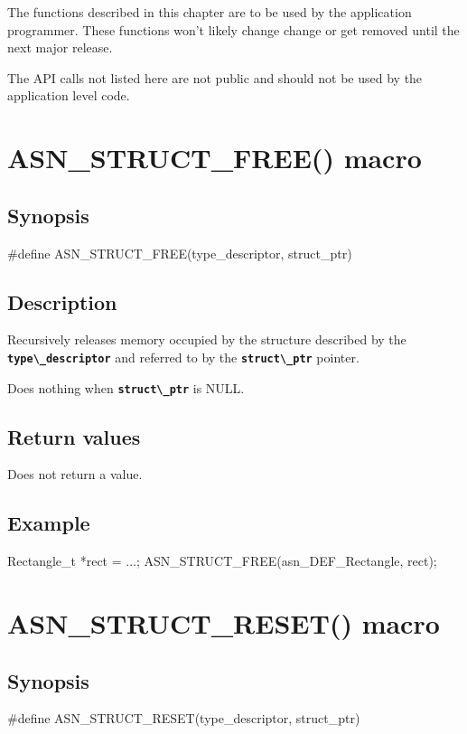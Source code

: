 \documentclass[english,oneside,12pt]{book}
\newcommand{\apisection}[2]{\clearpage\section{\label{#1}#2}}
\newcommand{\code}[1]{\texttt{\textbf{\lstinline{#1}}}}
\begin{document}
The functions described in this chapter are to be used by the application
programmer. These functions won't likely change change or get removed until
the next major release.

The API calls not listed here are not public and should not be used by the
application level code.

\apisection{sec:ASN_STRUCT_FREE}{ASN\_STRUCT\_FREE() macro}

\subsection*{Synopsis}

\begin{signature}
#define ASN_STRUCT_FREE(type_descriptor, struct_ptr)
\end{signature}

\subsection*{Description}

Recursively releases memory occupied by the structure
described by the \code{type\_descriptor} and referred to
by the \code{struct\_ptr} pointer.

Does nothing when \code{struct\_ptr} is NULL.

\subsection*{Return values}
Does not return a value.

\subsection*{Example}

\begin{example}
Rectangle_t *rect = ...;
ASN_STRUCT_FREE(asn_DEF_Rectangle, rect);
\end{example}

\apisection{sec:ASN_STRUCT_RESET}{ASN\_STRUCT\_RESET() macro}

\subsection*{Synopsis}

\begin{signature}
#define ASN_STRUCT_RESET(type_descriptor, struct_ptr)
\end{signature}
\end{document}
